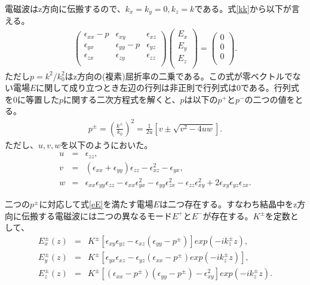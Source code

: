 電磁波はz方向に伝搬するので、$k_x=k_y=0, k_z=k$である。式\ref{kk}から以下が言える。
\begin{eqnarray}
\label{eE}
\left(
    \begin{array}{ccc}
      \epsilon_{xx}-p & \epsilon_{xy} & \epsilon_{xz} \\
      \epsilon_{yx} &  \epsilon_{yy} -p & \epsilon_{yz} \\
      \epsilon_{zx} & \epsilon_{zy} & \epsilon_{zz} \\
    \end{array}
\right)
\left( \begin{array}{c} E_x\\ E_y\\ E_z \\ \end{array} \right)
=\left( \begin{array}{c} 0\\ 0\\ 0 \\ \end{array} \right).
\end{eqnarray}
ただし$p=k^2/k_0^2$はz方向の(複素)屈折率の二乗である。この式が零ベクトルでない電場$E$に関して成り立つとき左辺の行列は非正則で行列式は0である。行列式を0に等置した$p$に関する二次方程式を解くと、$p$は以下の$p^+$と$p^-$の二つの値をとる。
\begin{eqnarray}
p^\pm = (\frac{k^\pm}{k_0})^2 =\frac{1}{2u}[v \pm \sqrt{v^2-4uw}].
\end{eqnarray}
ただし、$u,v,w$を以下のようにおいた。
\begin{eqnarray}
u &=& \epsilon_{zz},\\
v &=& (\epsilon_{xx}+\epsilon_{yy})\epsilon_{zz} -\epsilon_{xz}^2-\epsilon_{yx},\\
w &=& \epsilon_{xx}\epsilon_{yy}\epsilon_{zz}-\epsilon_{xx}\epsilon_{yx}^2-\epsilon_{yy}\epsilon_{zx}^2 -\epsilon_{zz}\epsilon_{xy}^2 +2\epsilon_{xy}\epsilon_{yz}\epsilon_{zx}.
\end{eqnarray}

二つの$p^\pm$に対応して式\ref{eE}を満たす電場$E$は二つ存在する。すなわち結晶中をz方向に伝搬する電磁波には二つの異なるモード$E^+$と$E^-$が存在する。$K^\pm$を定数として、
\begin{eqnarray}
E_x^\pm(z) &=& K^\pm [\epsilon_{xy} \epsilon_{yz}- \epsilon_{xz}(\epsilon_{yy}-p^\pm)]exp(-ik^\pm_zz),\\
E_y^\pm(z) &=& K^\pm [\epsilon_{yx} \epsilon_{xz}- \epsilon_{yz}(\epsilon_{xx}-p^\pm)exp(-ik^\pm_zz)],\\
E_z^\pm(z) &=& K^\pm [(\epsilon_{xx}-p^\pm) (\epsilon_{yy}-p^\pm) -\epsilon_{xy}^2]exp(-ik^\pm_zz).
\end{eqnarray}

